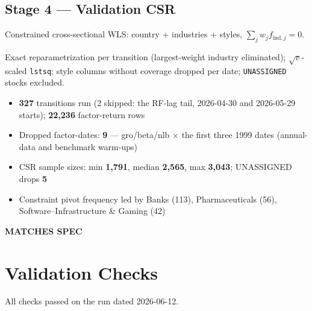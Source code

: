 \documentclass[11pt,a4paper]{article}
\newcommand{\PASS}[1]{\textcolor{pass}{\textbf{#1}}}
\begin{document}
\subsection{Stage 4 --- Validation CSR}

\begin{description}[style=nextline]
  \item[PDF SPEC] Constrained cross-sectional WLS: country + industries + styles, $\sum_j w_j f_{\text{ind},j} = 0$.
  \item[Implementation] Exact reparametrization per transition (largest-weight industry eliminated); $\sqrt{v}$-scaled \texttt{lstsq}; style columns without coverage dropped per date; \texttt{UNASSIGNED} stocks excluded.
  \item[Observed]\phantom{x}
    \begin{itemize}[nosep, topsep=-\parskip]
      \item \textbf{327} transitions run (2 skipped: the RF-lag tail, 2026-04-30 and 2026-05-29 starts); \textbf{22{,}236} factor-return rows
      \item Dropped factor-dates: \textbf{9} --- gro/beta/nlb $\times$ the first three 1999 dates (annual-data and benchmark warm-ups)
      \item CSR sample sizes: min \textbf{1{,}791}, median \textbf{2{,}565}, max \textbf{3{,}043}; UNASSIGNED drops \textbf{5}
      \item Constraint pivot frequency led by Banks (113), Pharmaceuticals (56), Software--Infrastructure \& Gaming (42)
    \end{itemize}
  \item[Status] \PASS{MATCHES SPEC}
\end{description}

\section{Validation Checks}

All checks passed on the run dated 2026-06-12.
\end{document}
